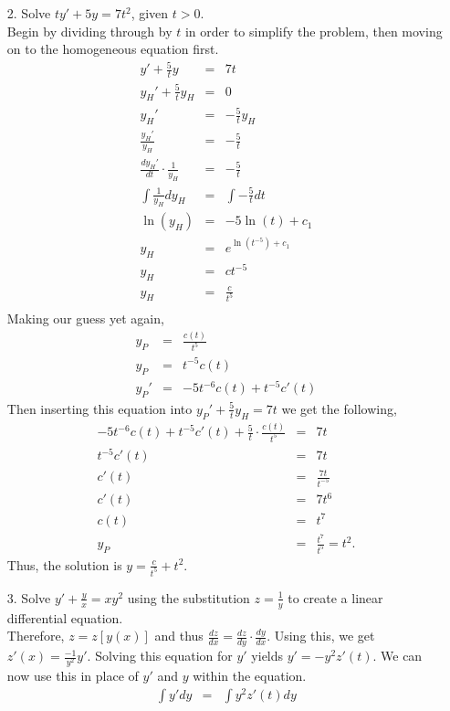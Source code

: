 \documentclass[10pt]{article}
\begin{document}
\begin{enumerate}
            \item[2.] Solve $ty'+5y=7t^2$, given $t>0$.\\
            Begin by dividing through by $t$ in order to simplify the problem, then moving on to the homogeneous equation first.
            \begin{eqnarray*}
                y'+\frac{5}{t}y&=&7t\\
                y_H'+\frac{5}{t}y_H&=&0\\
                y_H'&=&-\frac{5}{t}y_H\\
                \frac{y_H'}{y_H}&=&-\frac{5}{t}\\
                \frac{dy_H'}{dt}\cdot\frac{1}{y_H}&=&-\frac{5}{t}\\
                \int{\frac{1}{y_H}dy_H}&=&\int{-\frac{5}{t}dt}\\
                \ln(y_H)&=&-5\ln(t)+c_1\\
                y_H&=&e^{\ln(t^{-5})+c_1}\\
                y_H&=&c t^{-5}\\
                y_H&=&\frac{c}{t^5}\\
            \end{eqnarray*}
            Making our guess yet again,
            \begin{eqnarray*}
                y_P&=&\frac{c(t)}{t^5}\\
                y_P&=&t^{-5}c(t)\\
                y_P'&=&-5t^{-6}c(t)+t^{-5}c'(t)
            \end{eqnarray*}
            Then inserting this equation into $y_P'+\frac{5}{t}y_H=7t$ we get the following,
            \begin{eqnarray*}
                -5t^{-6}c(t)+t^{-5}c'(t)+\frac{5}{t}\cdot\frac{c(t)}{t^5}&=&7t\\
                t^{-5}c'(t)&=&7t\\
                c'(t)&=&\frac{7t}{t^{-5}}\\
                c'(t)&=&7t^6\\
                c(t)&=&t^7\\
                y_P&=&\frac{t^7}{t^5}=t^2.
            \end{eqnarray*}
        Thus, the solution is $y=\frac{c}{t^5}+t^2$.
        
        \item[3.] Solve $y'+\frac{y}{x}=xy^2$ using the substitution $z=\frac{1}{y}$ to create a linear differential equation.\\
        Therefore, $z=z[y(x)]$ and thus $\frac{dz}{dx}=\frac{dz}{dy}\cdot\frac{dy}{dx}$. Using this, we get $z'(x)=\frac{-1}{y^2}y'$. Solving this equation for $y'$ yields $y'=-y^2 z'(t)$. We can now use this in place of $y'$ and $y$ within the equation.
        \begin{eqnarray*}
            \int{y'dy}&=&\int{y^2 z'(t)dy}\\
        \end{eqnarray*}
        \end{enumerate}
        
\end{document}
